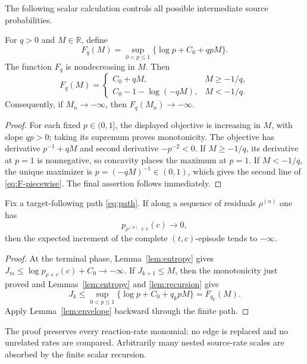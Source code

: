 The following scalar calculation controls all possible intermediate source
probabilities.

\begin{lemma}\label{lem:envelope}
For \(q>0\) and \(M\in\mathbb R\), define
\[
  F_q(M)=\sup_{0<p\le1}\{\log p+C_0+qpM\}.
\]
The function \(F_q\) is nondecreasing in \(M\).
Then
\begin{equation}\label{eq:F-piecewise}
  F_q(M)=
  \begin{cases}
    C_0+qM,&M\ge-1/q,\\
    C_0-1-\log(-qM),&M<-1/q.
  \end{cases}
\end{equation}
Consequently, if \(M_n\to-\infty\), then \(F_q(M_n)\to-\infty\).
\end{lemma}

\begin{proof}
For each fixed \(p\in(0,1]\), the displayed objective is increasing in
\(M\), with slope \(qp>0\); taking its supremum proves monotonicity.
The objective has derivative \(p^{-1}+qM\) and second derivative
\(-p^{-2}<0\).  If \(M\ge-1/q\), its derivative at \(p=1\) is nonnegative,
so concavity places the maximum at \(p=1\).  If \(M<-1/q\), the unique
maximizer is \(p=(-qM)^{-1}\in(0,1)\), which gives the second line of
\eqref{eq:F-piecewise}.  The final assertion follows immediately.
\end{proof}

\begin{proposition}\label{prop:propagation}
Fix a target-following path \eqref{eq:path}.  If along a sequence of residuals
\(\rho^{(n)}\) one has
\[
  p_{\rho^{(n)}+c}(c)\longrightarrow0,
\]
then the expected increment of the complete \((t,c)\)-episode tends to
\(-\infty\).
\end{proposition}

\begin{proof}
At the terminal phase, Lemma~\ref{lem:entropy} gives
\(J_m\le\log p_{\rho+c}(c)+C_0\to-\infty\).  If \(J_{k+1}\le M\), then the
monotonicity just proved and
Lemmas~\ref{lem:entropy} and \ref{lem:recursion} give
\[
  J_k\le\sup_{0<p\le1}\{\log p+C_0+q_kpM\}=F_{q_k}(M).
\]
Apply Lemma~\ref{lem:envelope} backward through the finite path.
\end{proof}

The proof preserves every reaction-rate monomial: no edge is replaced and no
unrelated rates are compared.  Arbitrarily many nested source-rate scales are
absorbed by the finite scalar recursion.

